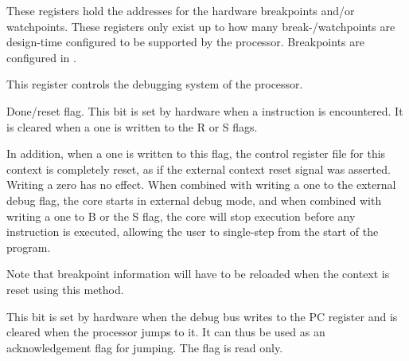 
These registers hold the addresses for the hardware breakpoints and/or
watchpoints. These registers only exist up to how many break-/watchpoints are
design-time configured to be supported by the processor. Breakpoints are
configured in .

\implementation{}


This register controls the debugging system of the \rvex{} processor.

Done/reset flag. This bit is set by hardware when a  instruction is 
encountered. It is cleared when a one is written to the R or S flags.

In addition, when a one is written to this flag, the control register file for 
this context is completely reset, as if the external context reset signal was 
asserted. Writing a zero has no effect. When combined with writing a one to the 
external debug flag, the core starts in external debug mode, and when combined 
with writing a one to B or the S flag, the core will stop execution before any 
instruction is executed, allowing the user to single-step from the start of the 
program.

Note that breakpoint information will have to be reloaded when the context is 
reset using this method.

\implementation{}

This bit is set by hardware when the debug bus writes to the PC register and is 
cleared when the processor jumps to it. It can thus be used as an acknowledgement
flag for jumping. The flag is read only.

